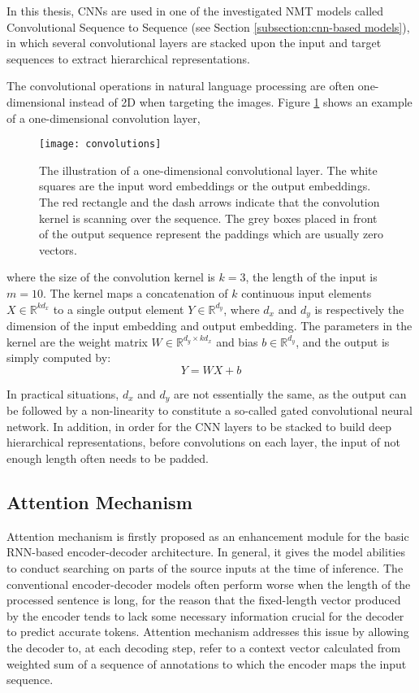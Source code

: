 In this thesis, CNNs are used in one of the investigated NMT models called Convolutional Sequence to Sequence (see Section \ref{subsection:cnn-based models}), in which several convolutional layers are stacked upon the input and target sequences to extract hierarchical representations.

The convolutional operations in natural language processing are often one-dimensional instead of 2D when targeting the images. Figure \ref{figure:convolutions} shows an example of a one-dimensional convolution layer, 
\begin{figure}[h]
\texttt{[image: convolutions]}
\centering
\caption{The illustration of a one-dimensional convolutional layer. The white squares are the input word embeddings or the output embeddings. The red rectangle and the dash arrows indicate that the convolution kernel is scanning over the sequence. The grey boxes placed in front of the output sequence represent the paddings which are usually zero vectors.}
\label{figure:convolutions}
\end{figure}
where the size of the convolution kernel is $ k=3 $, the length of the input is $ m=10 $. The kernel maps a concatenation of $ k $ continuous input elements $ X\in \mathbb{R}^{kd_{x}} $ to a single output element $ Y \in \mathbb{R}^{d_{y}} $, where $ d_{x} $ and $ d_{y} $ is respectively the dimension of the input embedding and output embedding. The parameters in the kernel are the weight matrix $ W \in \mathbb{R}^{d_{y} \times kd_{x}} $ and bias $ b \in \mathbb{R}^{d_{y}} $, and the output is simply computed by:
\[ Y = WX + b \]

In practical situations, $ d_{x} $ and $ d_{y} $ are not essentially the same, as the output can be followed by a non-linearity to constitute a so-called gated convolutional neural network. In addition, in order for the CNN layers to be stacked to build deep hierarchical representations, before convolutions on each layer, the input of not enough length often needs to be padded.

\subsection{Attention Mechanism} \label{subsection:attention}

Attention mechanism \cite{Bahdanau2014} is firstly proposed as an enhancement module for the basic RNN-based encoder-decoder architecture. In general, it gives the model abilities to conduct searching on parts of the source inputs at the time of inference. The conventional encoder-decoder models often perform worse when the length of the processed sentence is long, for the reason that the fixed-length vector produced by the encoder tends to lack some necessary information crucial for the decoder to predict accurate tokens. Attention mechanism addresses this issue by allowing the decoder to, at each decoding step, refer to a context vector calculated from weighted sum of a sequence of annotations to which the encoder maps the input sequence.

